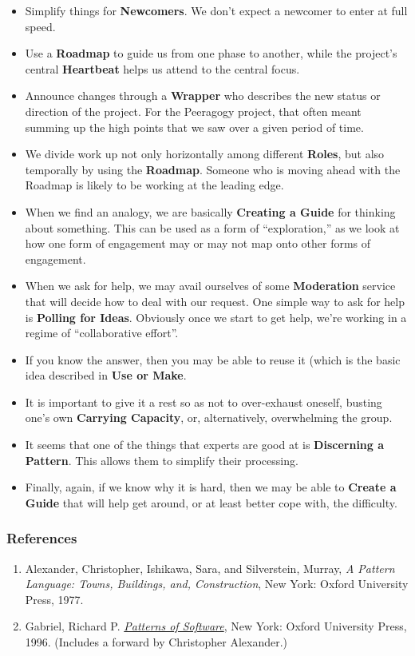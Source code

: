 \begin{itemize}
\item
  Simplify things for \textbf{Newcomers}. We don't expect a newcomer to
  enter at full speed.
\item
  Use a \textbf{Roadmap} to guide us from one phase to another, while
  the project's central \textbf{Heartbeat} helps us attend to the
  central focus.
\item
  Announce changes through a \textbf{Wrapper} who describes the new
  status or direction of the project. For the Peeragogy project, that
  often meant summing up the high points that we saw over a given period
  of time.
\item
  We divide work up not only horizontally among different
  \textbf{Roles}, but also temporally by using the \textbf{Roadmap}.
  Someone who is moving ahead with the Roadmap is likely to be working
  at the leading edge.
\item
  When we find an analogy, we are basically \textbf{Creating a Guide}
  for thinking about something. This can be used as a form of
  ``exploration,'' as we look at how one form of engagement may or may
  not map onto other forms of engagement.
\item
  When we ask for help, we may avail ourselves of some
  \textbf{Moderation} service that will decide how to deal with our
  request. One simple way to ask for help is \textbf{Polling for Ideas}.
  Obviously once we start to get help, we're working in a regime of
  ``collaborative effort''.
\item
  If you know the answer, then you may be able to reuse it (which is the
  basic idea described in \textbf{Use or Make}.
\item
  It is important to give it a rest so as not to over-exhaust oneself,
  busting one's own \textbf{Carrying Capacity}, or, alternatively,
  overwhelming the group.
\item
  It seems that one of the things that experts are good at is
  \textbf{Discerning a Pattern}. This allows them to simplify their
  processing.
\item
  Finally, again, if we know why it is hard, then we may be able to
  \textbf{Create a Guide} that will help get around, or at least better
  cope with, the difficulty.
\end{itemize}

\subsubsection{References}

\begin{enumerate}
\item
  Alexander, Christopher, Ishikawa, Sara, and Silverstein, Murray,
  \emph{A Pattern Language: Towns, Buildings, and, Construction}, New
  York: Oxford University Press, 1977.
\item
  Gabriel, Richard P.
  \emph{\href{http://dreamsongs.net/Files/PatternsOfSoftware.pdf}{Patterns
  of Software}}, New York: Oxford University Press, 1996. (Includes a
  forward by Christopher Alexander.)
\end{enumerate}
